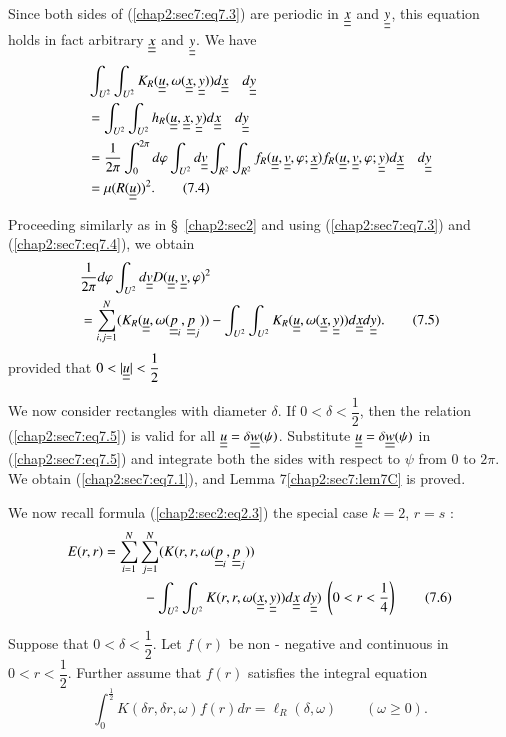 Since both sides of (\ref{chap2:sec7:eq7.3}) are periodic in $\underline{\underline{x}}$ and $\underline{\underline{y}}$, this equation holds in fact arbitrary $\underline{\underline{x}}$ and $\underline{\underline{y}}$. We have
\begin{align*}
& \int_{U^{2}} \int_{U^{2}} K_{R} (\underline{\underline{u}}, \omega(\underline{\underline{x}}, \underline{\underline{y}})) d\underline{\underline{x}} \quad d\underline{\underline{y}}\\
& = \int_{U^{2}} \int_{U^{2}} h_{R} (\underline{\underline{u}}, \underline{\underline{x}}, \underline{\underline{y}}) d\underline{\underline{x}} \quad d\underline{\underline{y}}\\
& = \frac{1}{2\pi} \int_{0}^{2\pi} d\varphi \int_{U^{2}} d\underline{\underline{v}} \int_{R^{2}} \int_{R^{2}} f_{R} (\underline{\underline{u}}, \underline{\underline{v}}, \varphi; \underline{\underline{x}}) f_{R} (\underline{\underline{u}}, \underline{\underline{v}}, \varphi; \underline{\underline{y}}) d\underline{\underline{x}} \quad d\underline{\underline{y}}\\
& = \mu (R(\underline{\underline{u}}))^{2}.\tag{7.4}\label{chap2:sec7:eq7.4}
\end{align*}

Proceeding similarly as in \S\ \ref{chap2:sec2} and using (\ref{chap2:sec7:eq7.3}) and (\ref{chap2:sec7:eq7.4}), we obtain
\begin{align*}
& \frac{1}{2\pi} d\varphi \int_{U^{2}} d\underline{\underline{v}} D(\underline{\underline{u}}, \underline{\underline{v}}, \varphi)^{2}\\
& = \sum_{i, j=1}^{N} (K_{R}(\underline{\underline{u}}, \omega(\underline{\underline{p}}_{i}, \underline{\underline{p}}_{j})) - \int_{U^{2}} \int_{U^{2}} K_{R} (\underline{\underline{u}}, \omega (\underline{\underline{x}}, \underline{\underline{y}}))d\underline{\underline{x}}  d\underline{\underline{y}}).\tag{7.5}\label{chap2:sec7:eq7.5}
\end{align*}\pageoriginale
provided that $0 < |\underline{\underline{u}}| < \dfrac{1}{2}$

We now consider rectangles with diameter $\delta$. If $0 < \delta < \dfrac{1}{2}$, then the relation (\ref{chap2:sec7:eq7.5}) is valid for all $\underline{\underline{u}} = \delta \underline{\underline{w}}(\psi)$. Substitute $\underline{\underline{u}} = \delta \underline{\underline{w}}(\psi)$ in (\ref{chap2:sec7:eq7.5}) and integrate both the sides with respect to $\psi$ from $0$ to $2\pi$. We obtain (\ref{chap2:sec7:eq7.1}), and Lemma 7\ref{chap2:sec7:lem7C} is proved.

We now recall formula (\ref{chap2:sec2:eq2.3}) the special case $k = 2$, $r = s$ :
\begin{align*}
E(r, r) & = \sum_{i=1}^{N} \sum_{j=1}^{N} (K(r, r, \omega(\underline{\underline{p}}_{i}, \underline{\underline{p}}_{j}))\\ 
& \hspace{1cm}- \int_{U^{2}} \int_{U^{2}} K(r, r, \omega(\underline{\underline{x}}, \underline{\underline{y}})) d\underline{\underline{x}} ~ d\underline{\underline{y}})~ \left(0 < r < \frac{1}{4}\right) \tag{7.6}\label{chap2:sec7:eq7.6}
\end{align*}

\begin{lemma}\label{chap2:sec7:lem7D}
Suppose that $0 < \delta < \dfrac{1}{2}$. Let $f(r)$ be non - negative and continuous in $0 < r < \dfrac{1}{2}$. Further assume that $f(r)$ satisfies the integral equation
\begin{equation*}
\int_{0}^{\frac{1}{2}} K(\delta r, \delta r, \omega) f(r) dr = \ell_{R} (\delta, \omega) \qquad (\omega \geq 0).\tag{7.7}\label{chap2:sec7:eq7.7}
\end{equation*}
\end{lemma}

